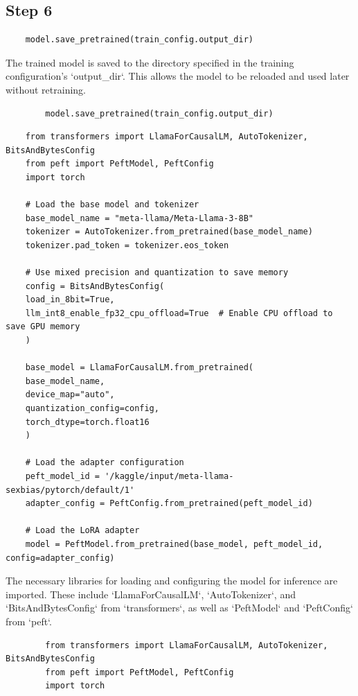 \documentclass{solutionclass} %
\begin{document}
\subsection*{Step 6}



\begin{lstlisting}
	model.save_pretrained(train_config.output_dir)
\end{lstlisting}

\begin{solution}
	The trained model is saved to the directory specified in the training configuration's `output\_dir`. This allows the model to be reloaded and used later without retraining.
	\begin{lstlisting}
		model.save_pretrained(train_config.output_dir)
	\end{lstlisting}
\end{solution}


\begin{lstlisting}
	from transformers import LlamaForCausalLM, AutoTokenizer, BitsAndBytesConfig
	from peft import PeftModel, PeftConfig
	import torch
	
	# Load the base model and tokenizer
	base_model_name = "meta-llama/Meta-Llama-3-8B"
	tokenizer = AutoTokenizer.from_pretrained(base_model_name)
	tokenizer.pad_token = tokenizer.eos_token
	
	# Use mixed precision and quantization to save memory
	config = BitsAndBytesConfig(
	load_in_8bit=True,
	llm_int8_enable_fp32_cpu_offload=True  # Enable CPU offload to save GPU memory
	)
	
	base_model = LlamaForCausalLM.from_pretrained(
	base_model_name,
	device_map="auto",
	quantization_config=config,
	torch_dtype=torch.float16
	)
	
	# Load the adapter configuration
	peft_model_id = '/kaggle/input/meta-llama-sexbias/pytorch/default/1'
	adapter_config = PeftConfig.from_pretrained(peft_model_id)
	
	# Load the LoRA adapter
	model = PeftModel.from_pretrained(base_model, peft_model_id, config=adapter_config)
\end{lstlisting}

\begin{solution}
	The necessary libraries for loading and configuring the model for inference are imported. These include `LlamaForCausalLM`, `AutoTokenizer`, and `BitsAndBytesConfig` from `transformers`, as well as `PeftModel` and `PeftConfig` from `peft`.
	\begin{lstlisting}
		from transformers import LlamaForCausalLM, AutoTokenizer, BitsAndBytesConfig
		from peft import PeftModel, PeftConfig
		import torch
	\end{lstlisting}
\end{solution}
\end{document}
